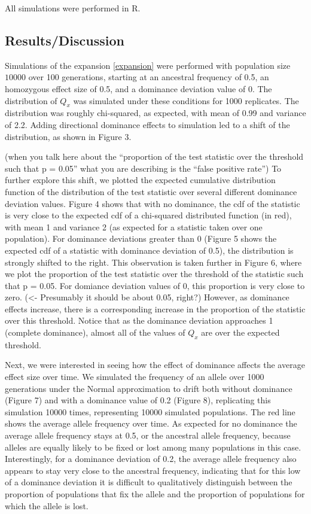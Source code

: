 \documentclass[a4paper,12pt]{article}
\newcommand{\jb}[1]{{\color{blue} (#1)} }
\begin{document}
All simulations were performed in R. 

\subsection*{Results/Discussion}
Simulations of the expansion \eqref{expansion} were performed with
population size $10000$ over 100 generations, starting at an ancestral
frequency of 0.5, an homozygous effect size of 0.5, and a dominance
deviation value of 0. The distribution of $Q_x$ was simulated under
these conditions for 1000 replicates. The distribution was roughly
chi-squared, as expected, with mean of 0.99 and variance of
2.2. Adding directional dominance effects to simulation led to a shift of the
distribution, as shown in Figure 3.


\jb{when you talk here about the ``proportion of the test statistic over the
threshold such that p = 0.05'' what you are describing is the ``false positive rate''}
To further explore this shift, we plotted the expected cumulative
distribution function of the distribution of the test statistic over
several different dominance deviation values. Figure 4 shows that with
no dominance, the cdf of the statistic is very close to the expected
cdf of a chi-squared distributed function (in red), with mean 1 and variance 2
(as expected for a statistic taken over one population). For dominance
deviations greater than 0 (Figure 5 shows the expected cdf of a
statistic with dominance deviation of 0.5), the distribution is
strongly shifted to the right. This observation is taken further in
Figure 6, where we plot the proportion of the test statistic over the
threshold of the statistic such that p = 0.05. For domiance deviation
values of 0, this proportion is very close to zero. \jb{<- Presumably it should be about 0.05, right?} However, as
dominance effects increase, there is a corresponding increase in the
proportion of the statistic over this threshold. Notice that as the
dominance deviation approaches 1 (complete dominance), almost all of
the values of $Q_x$ are  over the expected threshold.

Next, we were interested in seeing how the effect of dominance affects
the average effect size over time. We simulated the frequency of an
allele over 1000 generations under the Normal approximation to drift
both without dominance (Figure 7) and with a dominance value of 0.2
(Figure 8), replicating this simulation 10000 times, representing 10000
simulated populations. The red line shows the average allele frequency
over time. As expected for no dominance the average allele frequency
stays at 0.5, or the ancestral allele frequency, because alleles
are equally likely to be fixed or lost among many populations in this
case. Interestingly, for a dominance deviation of 0.2, the average allele
frequency also appears to stay very close to the ancestral frequency,
indicating that for this low of a dominance deviation it is difficult
to qualitatively distinguish between the proportion of populations
that fix the allele and the proportion of populations for which the
allele is lost.
\end{document}

